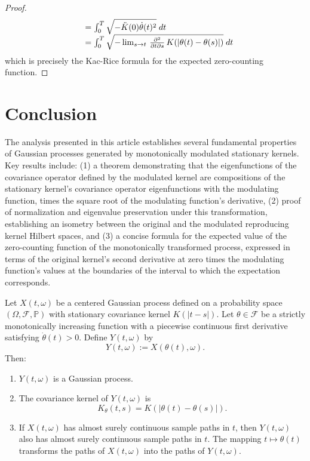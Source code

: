 \documentclass{mc}
\begin{document}
\begin{proof}
\begin{equation}
\begin{array}{ll}
      & = \int_0^T \sqrt{- \ddot{K} (0) \dot{\theta} (t)^2}  \hspace{0.27em}
      dt\\
      & = \int_0^T \sqrt{- \lim_{s \to t}  \hspace{0.17em}
      \frac{\partial^2}{\partial t \partial s}  \hspace{0.17em} K (| \theta
      (t) - \theta (s) |)}  \hspace{0.27em} dt
    \end{array}
  \end{equation}
  which is precisely the Kac-Rice formula for the expected zero-counting
  function.
\end{proof}


\section{Conclusion}

The analysis presented in this article establishes several fundamental
properties of Gaussian processes generated by monotonically modulated
stationary kernels. Key results include: (1) a theorem demonstrating that the
eigenfunctions of the covariance operator defined by the modulated kernel are 
compositions of the stationary kernel's covariance operator eigenfunctions with 
the modulating function, times the square root of the modulating function's 
derivative, (2) proof of normalization and eigenvalue preservation under this 
transformation, establishing an isometry between the original and the modulated 
reproducing kernel Hilbert spaces, and (3) a concise formula for the expected value 
of the zero-counting function of the monotonically transformed process, expressed 
in terms of the original kernel's second derivative at zero times the modulating function's
values at the boundaries of the interval to which the expectation corresponds.

\begin{theorem}
Let \(X(t,\omega)\) be a centered Gaussian process defined on a probability space \((\Omega, \mathcal{F}, \mathbb{P})\) with stationary covariance kernel \(K(|t - s|)\). Let \(\theta \in \mathcal{F}\) be a strictly monotonically increasing function with a piecewise continuous first derivative satisfying \(\dot{\theta}(t) > 0\). Define \(Y(t, \omega)\) by
\[
Y(t, \omega) := X(\theta(t), \omega).
\]
Then:
\begin{enumerate}
\item \(Y(t, \omega)\) is a Gaussian process.
\item The covariance kernel of \(Y(t, \omega)\) is
\[
K_{\theta}(t,s) = K(|\theta(t)-\theta(s)|).
\]
\item If \(X(t,\omega)\) has almost surely continuous sample paths in \(t\), then \(Y(t,\omega)\) also has almost surely continuous sample paths in \(t\). The mapping \(t \mapsto \theta(t)\) transforms the paths of \(X(t,\omega)\) into the paths of \(Y(t,\omega)\).
\end{enumerate}
\end{theorem}
\end{document}
